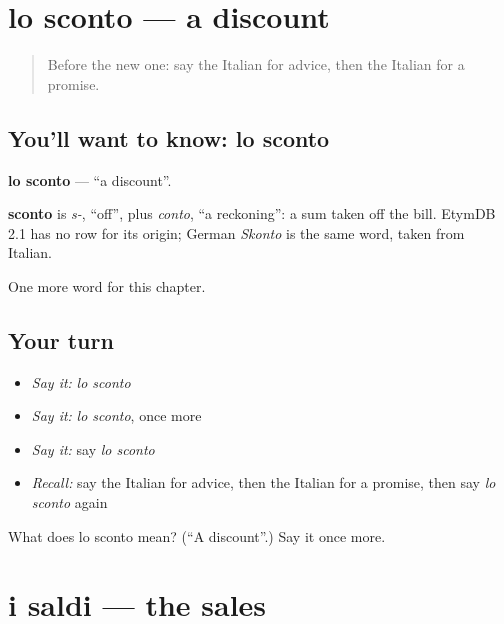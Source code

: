 \section[lo sconto]{lo sconto — a discount}

\label{lesson:IT-C197-sconto}



\begin{quote}
Before the new one: say the Italian for advice, then the Italian for a promise.
\end{quote}

\subsection*{You'll want to know: lo sconto}
\textbf{lo sconto} — \textquotedblleft{}a discount\textquotedblright{}.

\begin{cousinweb}
\textbf{sconto} is \emph{s-}, \textquotedblleft{}off\textquotedblright{}, plus \emph{conto}, \textquotedblleft{}a reckoning\textquotedblright{}: a sum taken off the bill. EtymDB 2.1 has no row for its origin; German \emph{Skonto} is the same word, taken from Italian.
\end{cousinweb}

\begin{grammarlens}[title={What you've built}]
One more word for this chapter.
\end{grammarlens}

\subsection*{Your turn}
\begin{itemize}
\raggedright
  \item \emph{Say it:} \emph{lo sconto}
  \item \emph{Say it:} \emph{lo sconto}, once more
  \item \emph{Say it:} say \emph{lo sconto}
  \item \emph{Recall:} say the Italian for advice, then the Italian for a promise, then say \emph{lo sconto} again
\end{itemize}

\begin{tcolorbox}[breakable,colback=teal!4,colframe=teal!35!black,title={Before you move on}]
What does lo sconto mean? (\textquotedblleft{}A discount\textquotedblright{}.) Say it once more.
\end{tcolorbox}
\section[i saldi]{i saldi — the sales}

